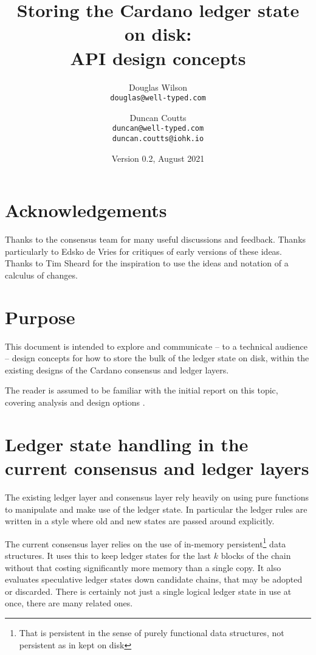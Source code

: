 \documentclass[11pt,a4paper]{article}
\begin{document}
\title{Storing the Cardano ledger state on disk: \\
       API design concepts
  }
\date{Version 0.2, August 2021}
\author{Douglas Wilson     \\ {\small \texttt{douglas@well-typed.com}} \\
   \and Duncan Coutts      \\ {\small \texttt{duncan@well-typed.com}} \\
                              {\small \texttt{duncan.coutts@iohk.io}}
   }

\maketitle

\section*{Acknowledgements}

Thanks to the consensus team for many useful discussions and feedback. Thanks
particularly to Edsko de Vries for critiques of early versions of these ideas.
Thanks to Tim Sheard for the inspiration to use the ideas and notation of a
calculus of changes.

\section{Purpose}

This document is intended to explore and communicate -- to a technical audience
-- design concepts for how to store the bulk of the ledger state on disk, within
the existing designs of the Cardano consensus and ledger layers.

The reader is assumed to be familiar with the initial report on this topic,
covering analysis and design options \citep{utxo-db}.

\tableofcontents

\section{Ledger state handling in the current consensus and ledger layers}

The existing ledger layer and consensus layer rely heavily on using pure
functions to manipulate and make use of the ledger state. In particular the
ledger rules are written in a style where old and new states are passed around
explicitly.

The current consensus layer relies on the use of in-memory
persistent\footnote{That is persistent in the sense of purely functional data
structures, not persistent as in kept on disk} data structures. It uses this
to keep ledger states for the last $k$ blocks of the chain without that costing
significantly more memory than a single copy. It also evaluates speculative
ledger states down candidate chains, that may be adopted or discarded. There is
certainly not just a single logical ledger state in use at once, there are many
related ones.
\end{document}
